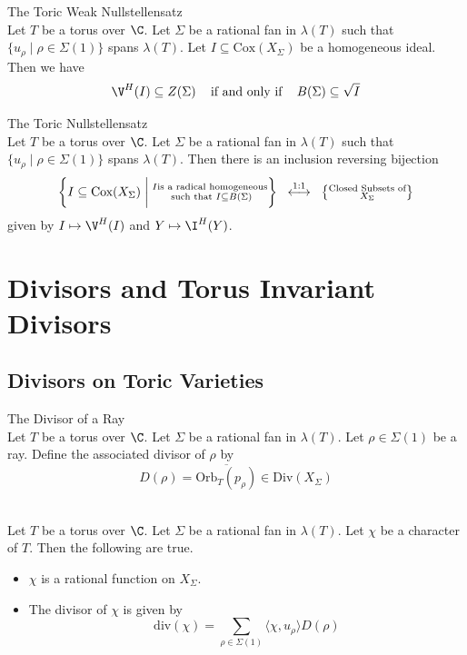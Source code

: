 \documentclass[a4paper]{article}
\begin{document}
\begin{thm}{The Toric Weak Nullstellensatz}{}\\
Let $T$ be a torus over $\C$. Let $\Sigma$ be a rational fan in $\lambda(T)$ such that $\{u_\rho\;|\;\rho\in\Sigma(1)\}$ spans $\lambda(T)$. Let $I\subseteq\text{Cox}(X_\Sigma)$ be a homogeneous ideal. Then we have $$\V^H(I)\subseteq Z(\Sigma)\;\;\;\text{ if and only if }\;\;\;B(\Sigma)\subseteq\sqrt{I}$$
\end{thm}

\begin{thm}{The Toric Nullstellensatz}{}\\
Let $T$ be a torus over $\C$. Let $\Sigma$ be a rational fan in $\lambda(T)$ such that $\{u_\rho\;|\;\rho\in\Sigma(1)\}$ spans $\lambda(T)$. Then there is an inclusion reversing bijection $$\left\{I\subseteq\text{Cox}(X_\Sigma)\;\bigg{|}\;\substack{I\text{is a radical homogeneous}\\\text{ such that }I\subseteq B(\Sigma)}\right\}\;\;\overset{\text{1:1}}{\longleftrightarrow}\;\;\left\{\substack{\text{Closed Subsets of}\\X_\Sigma}\right\}$$ given by $I\mapsto\V^H(I)$ and $Y\mapsto\I^H(Y)$. 
\end{thm}

\pagebreak
\section{Divisors and Torus Invariant Divisors}
\subsection{Divisors on Toric Varieties}
\begin{defn}{The Divisor of a Ray}{}\\
Let $T$ be a torus over $\C$. Let $\Sigma$ be a rational fan in $\lambda(T)$. Let $\rho\in\Sigma(1)$ be a ray. Define the associated divisor of $\rho$ by $$D(\rho)=\overline{\text{Orb}_T(p_\rho)}\in\text{Div}(X_\Sigma)$$
\end{defn}

\begin{prp}{}{}\\
Let $T$ be a torus over $\C$. Let $\Sigma$ be a rational fan in $\lambda(T)$. Let $\chi$ be a character of $T$. Then the following are true. 
\begin{itemize}
\item $\chi$ is a rational function on $X_\Sigma$. 
\item The divisor of $\chi$ is given by $$\text{div}(\chi)=\sum_{\rho\in\Sigma(1)}\langle\chi,u_\rho\rangle D(\rho)$$
\end{itemize}
\end{prp}
\end{document}
